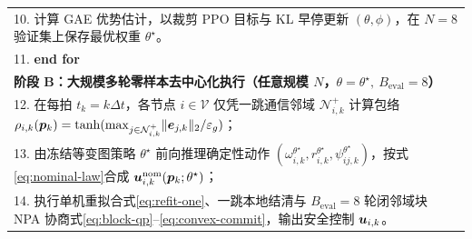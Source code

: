 \begin{table}[htbp]
\begin{tabularx}{\columnwidth}{@{}X@{}}
 10. \hspace{0.6em}计算 GAE 优势估计，以裁剪 PPO 目标与 KL 早停更新 $(\theta,\phi)$，在 $N=8$ 验证集上保存最优权重 $\theta^\star$。\\
 11. \textbf{end for}\\
 \midrule
 \textbf{阶段 B：大规模多轮零样本去中心化执行（任意规模 $N$，$\theta=\theta^\star,\ B_{\mathrm{eval}}=8$）}\\
 \midrule
 12. 在每拍 $t_k=k\Delta t$，各节点 $i\in\mathcal V$ 仅凭一跳通信邻域 $\mathcal N_{i,k}^+$ 计算包络 $\rho_{i,k}(\boldsymbol{p}_k)=\tanh(\max_{j\in\mathcal N_{i,k}^+}\lVert\boldsymbol{e}_{j,k}\rVert_2/\varepsilon_g)$；\\
 13. 由冻结等变图策略 $\theta^\star$ 前向推理确定性动作 $(\omega_{i,k}^{\theta^\star},r_{i,k}^{\theta^\star},\psi_{ij,k}^{\theta^\star})$，按式\eqref{eq:nominal-law}合成 $\boldsymbol{u}_{i,k}^{\mathrm{nom}}(\boldsymbol{p}_k;\theta^\star)$；\\
 14. 执行单机重拟合式\eqref{eq:refit-one}、一跳本地结清与 $B_{\mathrm{eval}}=8$ 轮闭邻域块 NPA 协商式\eqref{eq:block-qp}--\eqref{eq:convex-commit}，输出安全控制 $\boldsymbol{u}_{i,k}$。\\
 \bottomrule
 \end{tabularx}
\end{table}
